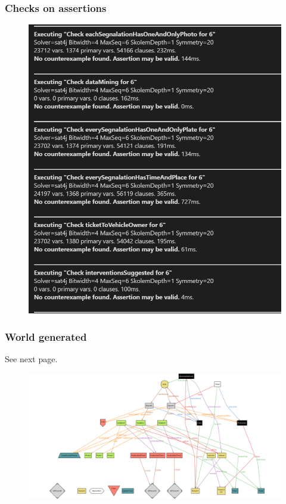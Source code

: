 \subsubsection{Checks on assertions}
\begin{figure}[h]
	\includegraphics[scale=0.75]{Images/Assert}
\end{figure}
\subsubsection{World generated}
See next page.
\newpage
\begin{figure}[h]
	\includegraphics[angle=90, scale=0.45, height=\textheight]{Images/world}
\end{figure}